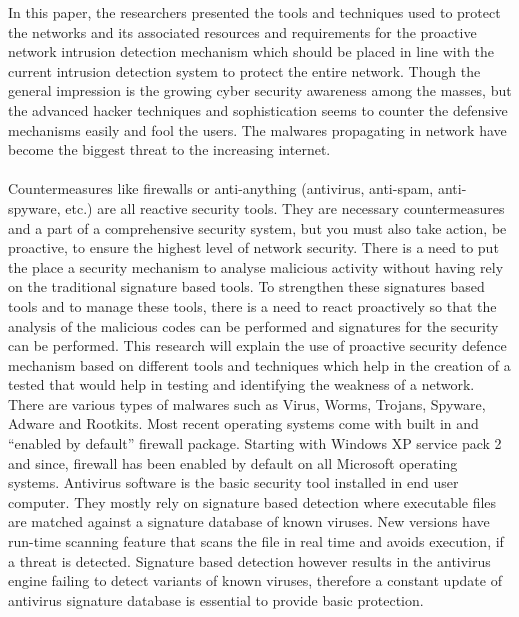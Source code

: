 \documentclass[11pt]{article}
\begin{document}
	In this paper, the researchers presented the tools and techniques used to protect the networks and its associated resources and requirements for the proactive network intrusion detection mechanism which should be placed in line with the current intrusion detection system to protect the entire network. Though the general impression is the growing cyber security awareness among the masses, but the advanced hacker techniques and sophistication seems to counter the defensive mechanisms easily and fool the users. The malwares propagating in network have become the biggest threat to the increasing internet. \\ \\
	Countermeasures like firewalls or anti-anything (antivirus, anti-spam, anti-spyware, etc.) are all reactive security tools. They are necessary countermeasures and a part of a comprehensive security system, but you must also take action, be proactive, to ensure the highest level of network security. There is a need to put the place a security mechanism to analyse malicious activity without having rely on the traditional signature based tools. To strengthen these signatures based tools and to manage these tools, there is a need to react proactively so that the analysis of the malicious codes can be performed and signatures for the security can be performed. This research will explain the use of proactive security defence mechanism based on different tools and techniques which help in the creation of a tested that would help in testing and identifying the weakness of a network. There are various types of malwares such as Virus, Worms, Trojans, Spyware, Adware and Rootkits. Most recent operating systems come with built in and “enabled by default” firewall package. Starting with Windows XP service pack 2 and since, firewall has been enabled by default on all Microsoft operating systems. Antivirus software is the basic security tool installed in end user computer. They mostly rely on signature based detection where executable files are matched against a signature database of known viruses. New versions have run-time scanning feature that scans the file in real time and avoids execution, if a threat is detected. Signature based detection however results in the antivirus engine failing to detect variants of known viruses, therefore a constant update of antivirus signature database is essential to provide basic protection.\\ \\
\end{document}
